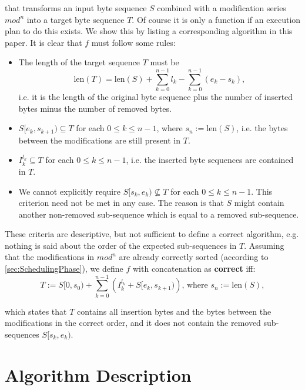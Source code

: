 \documentclass[english, 10pt, openright, twocolumn, landscape, twoside, notitlepage, a4paper, pdftex]		
{article}
\begin{document}
that transforms an input byte sequence $S$ combined with a modification series $mod^{n}$ into a target byte sequence $T$. Of course it is only a function if an execution plan to do this exists. We show this by listing a corresponding algorithm in this paper. It is clear that $f$ must follow some rules:
\begin{itemize}
\item The length of the target sequence $T$ must be \[\text{len}(T)=\text{len}(S)+\sum_{k=0}^{n-1}{l_{k}}-\sum_{k=0}^{n-1}{\left(e_{k}-s_{k}\right)},\]
i.e. it is the length of the original byte sequence plus the number of inserted bytes minus the number of  removed bytes.
\item $S[e_{k},s_{k+1})\subseteq T$ for each $0\leq k\leq n-1$, where $s_{n}:=\text{len}(S)$, i.e. the bytes between the modifications are still present in $T$.
\item $I_{k}^{l_{k}}\subseteq T$ for each $0\leq k\leq n-1$, i.e. the inserted byte sequences are contained in $T$.
\item We cannot explicitly require $S[s_{k},e_{k})\not\subseteq T$ for each $0\leq k\leq n-1$. This criterion need not be met in any case. The reason is that $S$ might contain another non-removed sub-sequence which is equal to a removed sub-sequence.
\end{itemize}

These criteria are descriptive, but not sufficient to define a correct algorithm, e.g. nothing is said about the order of the expected sub-sequences in $T$. Assuming that the modifications in $mod^{n}$ are already correctly sorted (according to \ref{sec:SchedulingPhase}), we define $f$ with concatenation as \textbf{correct} iff:
\[T:=S[0,s_{0})+\sum_{k=0}^{n-1}{\left(I_{k}^{l_{k}}+S[e_{k},s_{k+1})\right)}\text{, where }s_{n}:=\text{len}(S),\]

which states that $T$ contains all insertion bytes and the bytes between the modifications in the correct order, and it does not contain the removed sub-sequences $S[s_{k},e_{k})$.

\section{Algorithm Description}%
\label{sec:AlgorithmDescription}%
\end{document}
